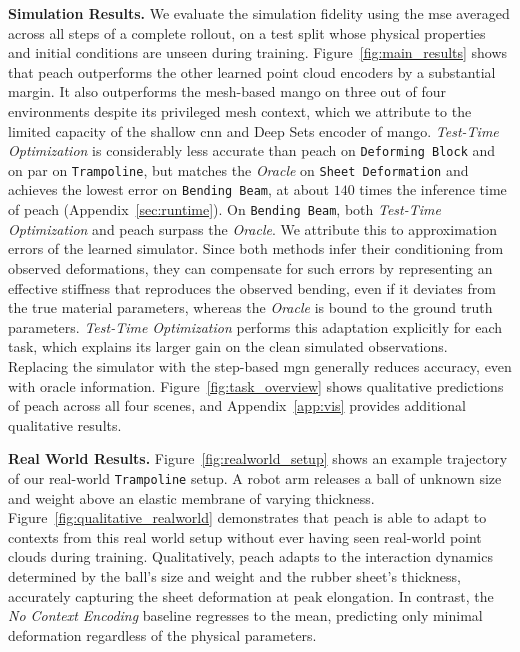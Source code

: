 
\textbf{Simulation Results.}
We evaluate the simulation fidelity using the \gls{mse} averaged across all steps of a complete rollout, on a test split whose physical properties and initial conditions are unseen during training.
Figure~\ref{fig:main_results} shows that \gls{peach} outperforms the other learned point cloud encoders by a substantial margin.
It also outperforms the mesh-based \gls{mango} on three out of four environments despite its privileged mesh context, which we attribute to the limited capacity of the shallow \gls{cnn} and Deep Sets encoder of \gls{mango}.
\textit{Test-Time Optimization} is considerably less accurate than \gls{peach} on \texttt{Deforming Block} and on par on \texttt{Trampoline}, but matches the \textit{Oracle} on \texttt{Sheet Deformation} and achieves the lowest error on \texttt{Bending Beam}, at about $140$ times the inference time of \gls{peach} (Appendix~\ref{sec:runtime}).
On \texttt{Bending Beam}, both \textit{Test-Time Optimization} and \gls{peach} surpass the \textit{Oracle}.
We attribute this to approximation errors of the learned simulator.
Since both methods infer their conditioning from observed deformations, they can compensate for such errors by representing an effective stiffness that reproduces the observed bending, even if it deviates from the true material parameters, whereas the \textit{Oracle} is bound to the ground truth parameters.
\textit{Test-Time Optimization} performs this adaptation explicitly for each task, which explains its larger gain on the clean simulated observations.
Replacing the simulator with the step-based \gls{mgn} generally reduces accuracy, even with oracle information.
Figure~\ref{fig:task_overview} shows qualitative predictions of \gls{peach} across all four scenes, and Appendix~\ref{app:vis} provides additional qualitative results.

\textbf{Real World Results.}
Figure~\ref{fig:realworld_setup} shows an example trajectory of our real-world \texttt{Trampoline} setup. 
A robot arm releases a ball of unknown size and weight above an elastic membrane of varying thickness.
Figure~\ref{fig:qualitative_realworld} demonstrates that \gls{peach} is able to adapt to contexts from this real world setup without ever having seen real-world point clouds during training.
Qualitatively, \gls{peach} adapts to the interaction dynamics determined by the ball's size and weight and the rubber sheet's thickness, accurately capturing the sheet deformation at peak elongation.
In contrast, the \textit{No Context Encoding} baseline regresses to the mean, predicting only minimal deformation regardless of the physical parameters.

